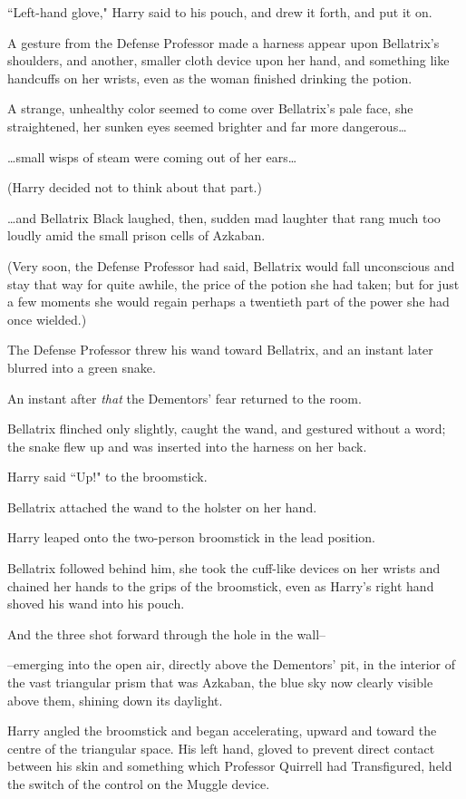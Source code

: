 ``Left-hand glove," Harry said to his pouch, and drew it forth, and put it on.

A gesture from the Defense Professor made a harness appear upon Bellatrix's shoulders, and another, smaller cloth device upon her hand, and something like handcuffs on her wrists, even as the woman finished drinking the potion.

A strange, unhealthy color seemed to come over Bellatrix's pale face, she straightened, her sunken eyes seemed brighter and far more dangerous{\ldots}

{\ldots}small wisps of steam were coming out of her ears{\ldots}

(Harry decided not to think about that part.)

{\ldots}and Bellatrix Black laughed, then, sudden mad laughter that rang much too loudly amid the small prison cells of Azkaban.

(Very soon, the Defense Professor had said, Bellatrix would fall unconscious and stay that way for quite awhile, the price of the potion she had taken; but for just a few moments she would regain perhaps a twentieth part of the power she had once wielded.)

The Defense Professor threw his wand toward Bellatrix, and an instant later blurred into a green snake.

An instant after \emph{that} the Dementors' fear returned to the room.

Bellatrix flinched only slightly, caught the wand, and gestured without a word; the snake flew up and was inserted into the harness on her back.

Harry said ``Up!" to the broomstick.

Bellatrix attached the wand to the holster on her hand.

Harry leaped onto the two-person broomstick in the lead position.

Bellatrix followed behind him, she took the cuff-like devices on her wrists and chained her hands to the grips of the broomstick, even as Harry's right hand shoved his wand into his pouch.

And the three shot forward through the hole in the wall\---

\---emerging into the open air, directly above the Dementors' pit, in the interior of the vast triangular prism that was Azkaban, the blue sky now clearly visible above them, shining down its daylight.

Harry angled the broomstick and began accelerating, upward and toward the centre of the triangular space. His left hand, gloved to prevent direct contact between his skin and something which Professor Quirrell had Transfigured, held the switch of the control on the Muggle device.

